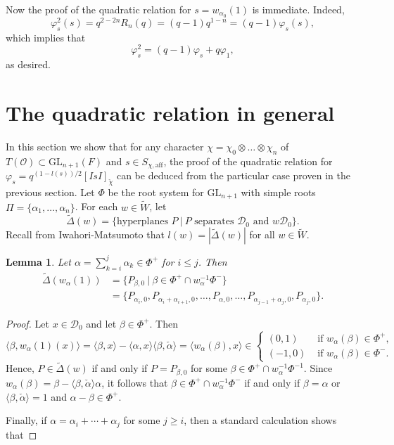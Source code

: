 \documentclass{article}
\newcommand{\GL}{\mathrm{GL}}
\newcommand{\aff}{\mathrm{aff}}
\newcommand{\calpha}{\check{\alpha}}
\newcommand{\cO}{\mathcal{O}}
\theoremstyle{plain}
\newtheorem{lemma}[theorem]{Lemma}
\theoremstyle{definition}
\begin{document}
    Now the proof of the quadratic relation for $s=w_{\alpha_0}(1)$ is immediate. Indeed,
    $$\varphi_s^2(s)=q^{2-2n}R_n(q)=(q-1)q^{1-n}=(q-1)\varphi_s(s),$$
    which implies that $$\varphi_s^2=(q-1)\varphi_s+q\varphi_1,$$
    as desired.
    \newpage

    \section{The quadratic relation in general}

    In this section we show that for any character $\chi=\chi_0\otimes\ldots\otimes\chi_n$ of $T(\cO)\subset\GL_{n+1}(F)$ and $s\in S_{\chi,\aff}$, the proof of the quadratic relation for $\varphi_s=q^{(1-l(s))/2}[IsI]_{\check{\chi}}$ can be deduced from the particular case proven in the previous section. Let $\Phi$ be the root system for $\GL_{n+1}$ with simple roots $\Pi=\{\alpha_1,\ldots,\alpha_n\}$. For each $w\in\tilde{W}$, let 
    $$\widetilde{\Delta}(w)=\{\text{hyperplanes }P\ |\ P\text{ separates }\mathcal{D}_0\text{ and }w\mathcal{D}_0\}.$$
    Recall from Iwahori-Matsumoto that $l(w)=|\widetilde{\Delta}(w)|$ for all $w\in\tilde{W}$.

    \begin{lemma}
        Let $\alpha=\sum_{k=i}^{j}\alpha_k\in\Phi^+$ for $i\leq j$. Then
        \begin{align*}
            \widetilde{\Delta}(w_\alpha(1))&=\{P_{\beta,0}\ |\ \beta\in\Phi^+\cap w_\alpha^{-1}\Phi^-\}\\
            &=\{P_{\alpha_i,0},P_{\alpha_i+\alpha_{i+1},0},\ldots,P_{\alpha,0},\ldots,P_{\alpha_{j-1}+\alpha_j,0},P_{\alpha_j,0}\}.
        \end{align*}
    \end{lemma}

    \begin{proof}
        Let $x\in\mathcal{D}_0$ and let $\beta\in\Phi^+$. Then
        \begin{equation*}
            \langle\beta,w_\alpha(1)(x)\rangle=\langle\beta,x\rangle-\langle\alpha,x\rangle\langle\beta,\calpha\rangle=\langle w_\alpha(\beta),x\rangle\in
            \begin{cases}
                (0,1) &\text{ if } w_\alpha(\beta)\in\Phi^+,\\
                (-1,0) &\text{ if } w_\alpha(\beta)\in\Phi^-.
            \end{cases}
        \end{equation*}
        Hence, $P\in\widetilde{\Delta}(w)$ if and only if $P=P_{\beta,0}$ for some $\beta\in\Phi^+\cap w_\alpha^{-1}\Phi^{-1}$. Since $w_\alpha(\beta)=\beta-\langle\beta,\calpha\rangle\alpha$, it follows that $\beta\in\Phi^+\cap w_\alpha^{-1}\Phi^-$ if and only if $\beta=\alpha$ or $\langle\beta,\calpha\rangle=1$ and $\alpha-\beta\in\Phi^+$.
        
        Finally, if $\alpha=\alpha_i+\cdots+\alpha_j$ for some $j\geq i$, then a standard calculation shows that 
    \end{proof}
\end{document}
